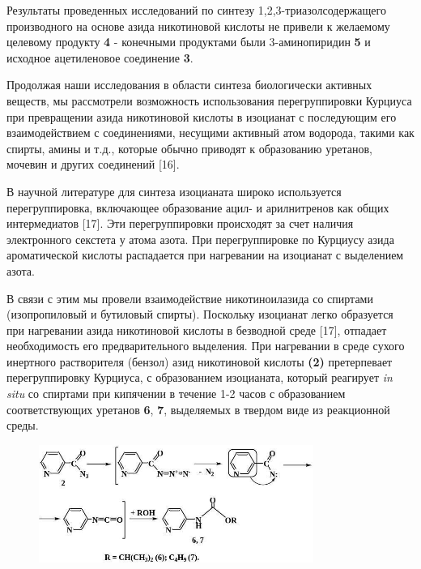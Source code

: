 \begin{multicols}{2}
Результаты проведенных исследований по синтезу 1,2,3-триазолсодержащего
производного на основе азида никотиновой кислоты не привели к желаемому
целевому продукту {\bfseries 4} - конечными продуктами были 3-аминопиридин
{\bfseries 5} и исходное ацетиленовое соединение {\bfseries 3}.

Продолжая наши исследования в области синтеза биологически активных
веществ, мы рассмотрели возможность использования перегруппировки
Курциуса при превращении азида никотиновой кислоты в изоцианат с
последующим его взаимодействием с соединениями, несущими активный атом
водорода, такими как спирты, амины и т.д., которые обычно приводят к
образованию уретанов, мочевин и других соединений {[}16{]}.

В научной литературе для синтеза изоцианата широко используется
перегруппировка, включающее образование ацил- и арилнитренов как общих
интермедиатов {[}17{]}. Эти перегруппировки происходят за счет наличия
электронного секстета у атома азота. При перегруппировке по Курциусу
азида ароматической кислоты распадается при нагревании на изоцианат с
выделением азота.

В связи с этим мы провели взаимодействие никотиноилазида со спиртами
(изопропиловый и бутиловый спирты). Поскольку изоцианат легко образуется
при нагревании азида никотиновой кислоты в безводной среде {[}17{]},
отпадает необходимость его предварительного выделения. При нагревании в
среде сухого инертного растворителя (бензол) азид никотиновой кислоты
{\bfseries (2)} претерпевает перегруппировку Курциуса, с образованием
изоцианата, который реагирует \emph{in situ} со спиртами при кипячении в
течение 1-2 часов с образованием соответствующих уретанов {\bfseries 6},
{\bfseries 7}, выделяемых в твердом виде из реакционной среды.
\end{multicols}

\begin{figure}[H]
	\centering
	\includegraphics[width=0.8\textwidth]{assets/5}
\end{figure}

